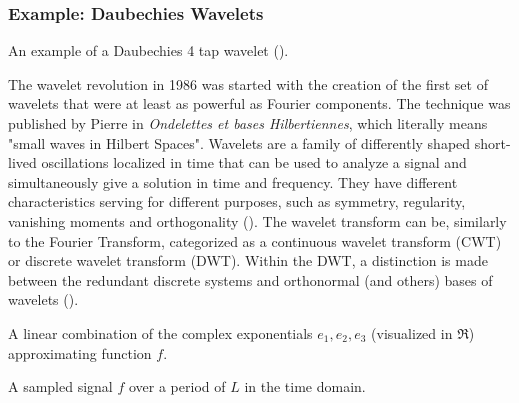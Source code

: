 \subsubsection{Example: Daubechies Wavelets}
\begin{marginfigure}
\vspace{3cm}
\centering

\caption{An example of a Daubechies 4 tap wavelet (\cite{lutzl_d4_2009}).}
\label{daubechieswavelet} \vspace{1cm}
\end{marginfigure}

The wavelet revolution in 1986 was started with the creation of the first set of wavelets that were at least as powerful as Fourier components. The technique was published by Pierre \textcite{lemarie_ondelettes_1986} in \textit{Ondelettes et bases Hilbertiennes}, which literally means "small waves in Hilbert Spaces".  Wavelets are a family of differently shaped short-lived oscillations localized in time that can be used to analyze a signal and simultaneously give a solution in time and frequency. They have different characteristics serving for different purposes, such as symmetry, regularity, vanishing moments and orthogonality (\cite{kainulainen_image_2022}). The wavelet transform can be, similarly to the Fourier Transform, categorized as a continuous wavelet transform (CWT) or discrete wavelet transform (DWT). Within the DWT, a distinction is made between the redundant discrete systems and orthonormal (and others) bases of wavelets  (\cite{daubechies_ten_1992}). 

\begin{marginfigure}
\centering

\vspace{0.3cm}
\caption{A linear combination of the complex exponentials $e_1, e_2, e_3$ (visualized in $\Re$) approximating function $f$.}
\label{basisFunctions} 
\vspace{2cm}
\end{marginfigure}

\begin{marginfigure}
\centering

\vspace{0.3cm}
\caption{A sampled signal $f$ over a period of $L$ in the time domain.}
\label{sampledSignal} 
\end{marginfigure}

